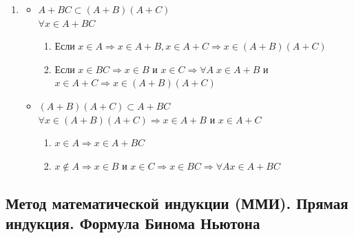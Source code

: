 \begin{tcolorbox}[title=Доказательства]
\begin{enumerate}
\begin{itemize}
    \item $AB + AC \subset A(B+C)$\\
    $\forall x \in AB + AC \Rightarrow x \in AB \text{ или } x \in AC$
    \begin{enumerate}
        \item Если $x \in AB \Rightarrow x \in A \text{ и } x \in B$. Так как $x \in B \Rightarrow x \in B + C$. Итог: $x \in A$ и $x \in B+C \Rightarrow x \in A(B+C)$
        \item Если $x \in AC \Rightarrow x \in A \text{ и } x \in C$. Так как $x \in C \Rightarrow x \in B + C$. Итог: $x \in A$ и $x \in B+C \Rightarrow x \in A(B+C)$
    \end{enumerate}
\end{itemize}
	\item \begin{itemize}
		\item $A + BC \subset (A + B)(A + C)$\\
			$\forall x \in A + BC$
			\begin{enumerate}
				\item Если $x \in A \Rightarrow x \in A + B, x \in A + C \Rightarrow x \in (A + B)(A + C)$
				\item Если $x \in BC \Rightarrow x \in B$ и $x \in C \Rightarrow \forall A\; x \in A + B$ и $x \in A + C \Rightarrow x \in (A + B)(A + C)$
			\end{enumerate}
				\item $(A + B)(A + C) \subset A + BC $\\
					$\forall x \in (A + B)(A + C) \Rightarrow x \in A + B$ и $x \in A + C $
	\begin{enumerate}
		\item $x \in A \Rightarrow x \in A + BC$
		\item $x \not\in A \Rightarrow x \in B$ и $x \in C \Rightarrow x \in BC \Rightarrow \forall A x \in A + BC$
	\end{enumerate}
	\end{itemize}
	\end{enumerate}
\end{tcolorbox}

\subsection{Метод математической индукции (ММИ). Прямая индукция. Формула Бинома Ньютона}

